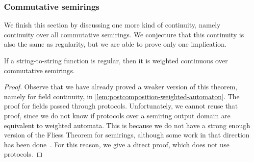 \subsubsection{Commutative semirings}
We finish this section by discussing one more kind of continuity, namely continuity over all commutative semirings. We conjecture that this continuity is also the same as regularity, but we are able to prove only one implication.
\label{sec:commutative-semirings}
\begin{theorem}\label{thm:regular-continuous-commutative-semirings}
    If a string-to-string function is  regular, then it is weighted continuous over commutative semirings.
\end{theorem}
\begin{proof}
    Observe that we have already proved a weaker version of this theorem, namely for field continuity, in \cref{lem:postcomposition-weighted-automaton}. The proof for fields passed through protocols. Unfortunately, we cannot reuse that proof, since we do not know if protocols over a semiring output domain are equivalent to weighted automata. This is because we do not have a strong enough version of the Fliess Theorem for semirings, although some work in that direction has been done~\cite[Corollary 2.15]{daviaud25}. For this reason, we give a direct proof, which does not use protocols. 


\end{proof}
